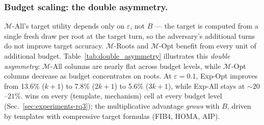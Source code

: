 


\subsubsection{Budget scaling: the double asymmetry.}
\label{sec:double-asymmetry}
 
$\mathcal{M}$-All's target utility depends only on $\varepsilon$, not $B$ --- the target is computed from a single fresh draw per root at the target turn, so the adversary's additional turns do not improve target accuracy. $\mathcal{M}$-Roots and $\mathcal{M}$-Opt benefit from every unit of additional budget. Table~\ref{tab:double_asymmetry} illustrates this \emph{double asymmetry}: $\mathcal{M}$-All columns are nearly flat across budget levels, while $\mathcal{M}$-Opt columns decrease as budget concentrates on roots. At $\varepsilon = 0.1$, Exp-Opt improves from 13.6\% ($k{+}1$) to 7.8\% ($2k{+}1$) to 5.6\% ($3k{+}1$), while Exp-All stays at ${\sim}20$--$21\%$. \sysname{} wins on every (template, mechanism) cell at every budget level (Sec.~\ref{sec:experiments-rq3}); the multiplicative advantage \emph{grows} with $B$, driven by templates with compressive target formulas (FIB4, HOMA, AIP).

